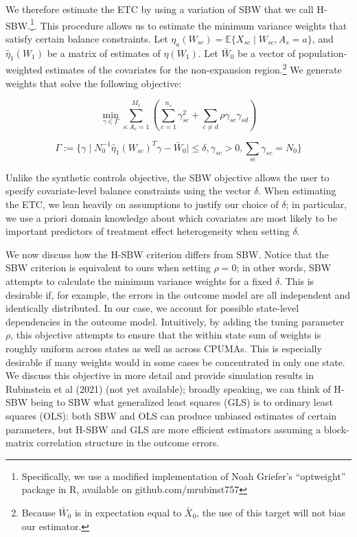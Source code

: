 \documentclass[12pt]{article}
\begin{document}
We therefore estimate the ETC by using a variation of SBW that we call H-SBW.\footnote{Specifically, we use a modified implementation of Noah Griefer's ``optweight'' package in R, available on github.com/mrubinst757}. This procedure allows us to estimate the minimum variance weights that satisfy certain balance constraints. Let $\eta_a(W_{sc}) = \mathbb{E}\{X_{sc} \mid W_{sc}, A_s = a\}$, and $\hat{\eta}_1(W_1)$ be a matrix of estimates of $\eta(W_1)$. Let $\bar{W}_0$ be a vector of population-weighted estimates of the covariates for the non-expansion region.\footnote{Because $\bar{W}_0$ is in expectation equal to $\bar{X}_0$, the use of this target will not bias our estimator.} We generate weights that solve the following objective:

$$
\min_{\gamma \in \Gamma} \sum_{s: A_s = 1}^{M_1}(\sum_{c = 1}^{n_s} \gamma_{sc}^2 + \sum_{c \ne d}\rho \gamma_{sc}\gamma_{sd})
$$

$$
\Gamma := \{\gamma \mid N_0^{-1}\hat{\eta}_1(W_{sc})^T\gamma - \bar{W}_0 \mid \le \delta, \gamma_{sc} > 0, \sum_{sc}\gamma_{sc} = N_0\}
$$

Unlike the synthetic controls objective, the SBW objective allows the user to specify covariate-level balance constraints using the vector $\delta$. When estimating the ETC, we lean heavily on assumptions to justify our choice of $\delta$; in particular, we use a priori domain knowledge about which covariates are most likely to be important predictors of treatment effect heterogeneity when setting $\delta$. 

We now discuss how the H-SBW criterion differs from SBW. Notice that the SBW criterion is equivalent to ours when setting $\rho = 0$; in other words, SBW attempts to calculate the minimum variance weights for a fixed $\delta$. This is desirable if, for example, the errors in the outcome model are all independent and identically distributed. In our case, we account for possible state-level dependencies in the outcome model. Intuitively, by adding the tuning parameter $\rho$, this objective attempts to ensure that the within state sum of weights is roughly uniform across states as well as across CPUMAs. This is especially desirable if many weights would in some cases be concentrated in only one state. We discuss this objective in more detail and provide simulation results in Rubinstein et al (2021) (not yet available); broadly speaking, we can think of H-SBW being to SBW what generalized least squares (GLS) is to ordinary least squares (OLS): both SBW and OLS can produce unbiased estimates of certain parameters, but H-SBW and GLS are more efficient estimators assuming a block-matrix correlation structure in the outcome errors.
\end{document}
